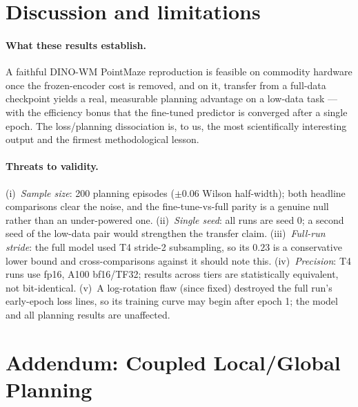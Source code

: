 \documentclass[11pt,a4paper]{article}
\begin{document}
\section{Discussion and limitations}
\label{sec:discussion}

\paragraph{What these results establish.} A faithful DINO-WM PointMaze
reproduction is feasible on commodity hardware once the frozen-encoder cost is
removed, and on it, transfer from a full-data checkpoint yields a real,
measurable planning advantage on a low-data task --- with the efficiency
bonus that the fine-tuned predictor is converged after a single epoch. The
loss/planning dissociation is, to us, the most scientifically interesting
output and the firmest methodological lesson.

\paragraph{Threats to validity.} (i)~\emph{Sample size}: 200 planning episodes
($\pm0.06$ Wilson half-width); both headline comparisons clear the noise, and
the fine-tune-vs-full parity is a genuine null rather than an under-powered
one. (ii)~\emph{Single seed}: all runs are seed 0; a second seed of the
low-data pair would strengthen the transfer claim. (iii)~\emph{Full-run
stride}: the full model used T4 stride-2 subsampling, so its $0.23$ is a
conservative lower bound and cross-comparisons against it should note this. (iv)~\emph{Precision}: T4 runs
use fp16, A100 bf16/TF32; results across tiers are statistically equivalent,
not bit-identical. (v)~A log-rotation flaw (since fixed) destroyed the
full run's early-epoch loss lines, so its training curve may begin after epoch
1; the model and all planning results are unaffected.

\section{Addendum: Coupled Local/Global Planning}
\label{sec:localglobal}
\end{document}
